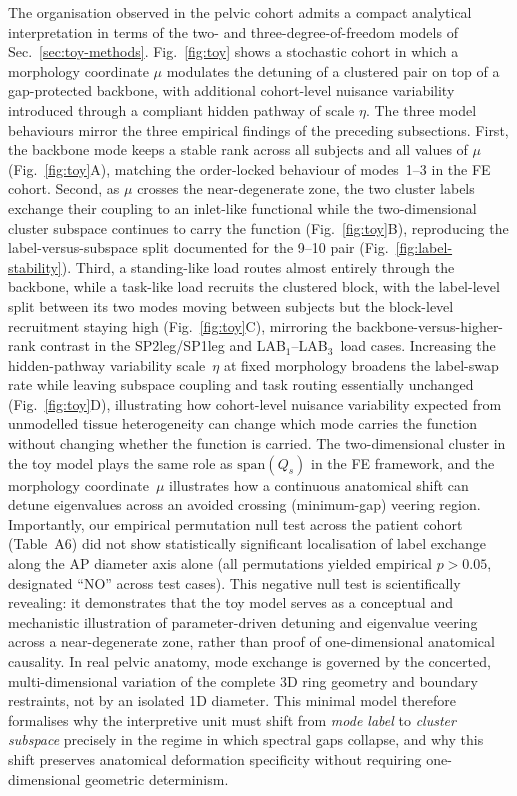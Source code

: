 \documentclass[11pt]{article}
\newcommand{\LAB}{LAB$_1$--LAB$_3$}
\begin{document}
The organisation observed in the pelvic cohort admits a compact analytical interpretation in terms of the two- and three-degree-of-freedom models of Sec.~\ref{sec:toy-methods}.
Fig.~\ref{fig:toy} shows a stochastic cohort in which a morphology coordinate $\mu$ modulates the detuning of a clustered pair on top of a gap-protected backbone, with additional cohort-level nuisance variability introduced through a compliant hidden pathway of scale $\eta$.
The three model behaviours mirror the three empirical findings of the preceding subsections.
First, the backbone mode keeps a stable rank across all subjects and all values of $\mu$ (Fig.~\ref{fig:toy}A), matching the order-locked behaviour of modes~1--3 in the FE cohort.
Second, as $\mu$ crosses the near-degenerate zone, the two cluster labels exchange their coupling to an inlet-like functional while the two-dimensional cluster subspace continues to carry the function (Fig.~\ref{fig:toy}B), reproducing the label-versus-subspace split documented for the 9--10 pair (Fig.~\ref{fig:label-stability}).
Third, a standing-like load routes almost entirely through the backbone, while a task-like load recruits the clustered block, with the label-level split between its two modes moving between subjects but the block-level recruitment staying high (Fig.~\ref{fig:toy}C), mirroring the backbone-versus-higher-rank contrast in the SP2leg/SP1leg and \LAB\ load cases.
Increasing the hidden-pathway variability scale~$\eta$ at fixed morphology broadens the label-swap rate while leaving subspace coupling and task routing essentially unchanged (Fig.~\ref{fig:toy}D), illustrating how cohort-level nuisance variability expected from unmodelled tissue heterogeneity can change which mode carries the function without changing whether the function is carried.
The two-dimensional cluster in the toy model plays the same role as $\mathrm{span}(Q_s)$ in the FE framework, and the morphology coordinate~$\mu$ illustrates how a continuous anatomical shift can detune eigenvalues across an avoided crossing (minimum-gap) veering region.
Importantly, our empirical permutation null test across the patient cohort (Table~A6) did not show statistically significant localisation of label exchange along the AP diameter axis alone (all permutations yielded empirical $p > 0.05$, designated ``NO'' across test cases).
This negative null test is scientifically revealing: it demonstrates that the toy model serves as a conceptual and mechanistic illustration of parameter-driven detuning and eigenvalue veering across a near-degenerate zone, rather than proof of one-dimensional anatomical causality.
In real pelvic anatomy, mode exchange is governed by the concerted, multi-dimensional variation of the complete 3D ring geometry and boundary restraints, not by an isolated 1D diameter.
This minimal model therefore formalises why the interpretive unit must shift from \emph{mode label} to \emph{cluster subspace} precisely in the regime in which spectral gaps collapse, and why this shift preserves anatomical deformation specificity without requiring one-dimensional geometric determinism.
\end{document}
